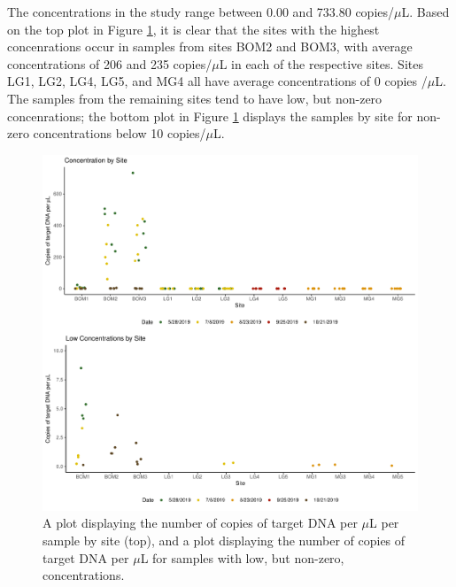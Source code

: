 \documentclass[12pt]{article}\usepackage[]{graphicx}\usepackage[]{color}
\makeatletter
\def\maxwidth{ %
  \ifdim\Gin@nat@width>\linewidth
    \linewidth
  \else
    \Gin@nat@width
  \fi
}
\newenvironment{knitrout}{}{} %
\def\maxwidth{ %
  \ifdim\Gin@nat@width>\linewidth
    \linewidth
  \else
    \Gin@nat@width
  \fi
}
\newenvironment{knitrout}{}{} %
\makeatother
\begin{document}
The concentrations in the study range between 0.00 and 733.80 copies/$\mu$L. Based on the top plot in Figure \ref{fig:eDNA_concentration}, it is clear that the sites with the highest concenrations occur in samples from sites BOM2 and BOM3, with average concentrations of 206 and 235 copies/$\mu$L  in each of the respective sites. Sites LG1, LG2, LG4, LG5, and MG4 all have average concentrations of 0 copies /$\mu$L. The samples from the remaining sites tend to have low, but non-zero concenrations; the bottom plot in Figure \ref{fig:eDNA_concentration} displays the samples by site for non-zero concentrations below 10 copies/$\mu$L.  



\begin{figure}[]
\begin{knitrout}
\color{fgcolor}

{\centering \includegraphics[width=\maxwidth]{figure/eDNA_visualization_concentration-1} 

}



\end{knitrout}
\caption{A plot displaying the number of copies of target DNA per $\mu$L per sample by site (top), and a plot displaying the number of copies of target DNA per $\mu$L for samples with low, but non-zero, concentrations.}
\label{fig:eDNA_concentration}
\end{figure}
\end{document}
